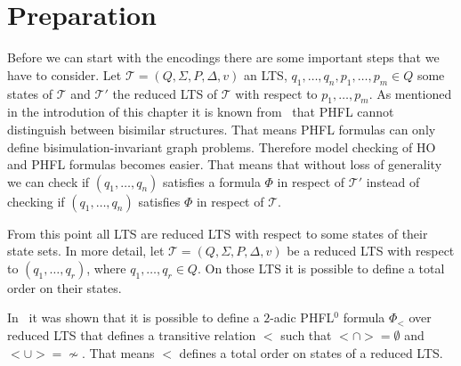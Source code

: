 \section{Preparation}\label{sec:lower_bounds_preparation}

Before we can start with the encodings there are some important steps that we have to consider.  Let $\mathcal{T} = (Q, 
\Sigma, P, \Delta, v)$ an LTS, $q_1, \dots, q_n, p_1, \dots, p_m \in Q$ some states of $\mathcal{T}$ and $\mathcal{T}'$ the 
reduced LTS of $\mathcal{T}$ with respect to $p_1, \dots, p_m$.  
As mentioned in the introdution of this chapter it is known from~\cite{lange2014capturing} that PHFL cannot distinguish 
between bisimilar structures. That means PHFL formulas can only define bisimulation-invariant graph problems. Therefore model checking of HO and PHFL formulas becomes easier. That means that without loss of generality we can check if $(q_1, \dots, q_n)$ satisfies a formula $\Phi$ in respect of $\mathcal{T}'$ instead of checking if $(q_1, \dots, q_n)$ satisfies 
$\Phi$ in respect of $\mathcal{T}$. 

From this point all LTS are reduced LTS with respect to some states of their state sets. In more detail, let $\mathcal{T} = (Q, \Sigma, P, \Delta, v)$ be a reduced LTS with respect to $(q_1, \dots, q_r)$, where $q_1, \dots, q_r \in Q$. On those LTS it is possible to define a total order on their states. 

\begin{remark} \label{remark:transitive_relation}
    In~\cite{otto1999bisimulation} it was shown that it is possible to define a $2$-adic PHFL$^0$ formula $\Phi_<$ over reduced LTS that defines a
    transitive relation $<$ such that $< \cap > = \emptyset$ and $< \cup > = \not\sim$. That means $<$ defines a total
    order on states of a reduced LTS.
\end{remark}